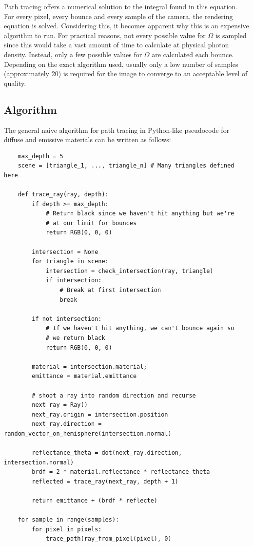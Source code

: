 \documentclass[
  twoside,
  11pt, a4paper,
  footinclude=true,
  headinclude=true,
  cleardoublepage=empty
]{scrreprt}
\begin{document}
Path tracing offers a numerical solution to the integral found in this equation. For every pixel,
every bounce and every sample of the camera, the rendering equation is solved. Considering this, it becomes apparent
why this is an expensive algorithm to run. For practical reasons, not every possible value for
\(\Omega\) is sampled since this would take a vast amount of time to calculate at physical photon
density. Instead, only a few possible values for \(\Omega\) are calculated each bounce. Depending
on the exact algorithm used, usually only a low number of samples (approximately 20) is required for the
image to converge to an acceptable level of quality.

\subsection{Algorithm}
\label{algorithm}
The general naive algorithm for path tracing in Python-like pseudocode for diffuse and
emissive materials can be written as follows:

\begin{verbatim}
    max_depth = 5
    scene = [triangle_1, ..., triangle_n] # Many triangles defined here

    def trace_ray(ray, depth):
        if depth >= max_depth:
            # Return black since we haven't hit anything but we're
            # at our limit for bounces
            return RGB(0, 0, 0) 

        intersection = None
        for triangle in scene:
            intersection = check_intersection(ray, triangle)
            if intersection:
                # Break at first intersection
                break

        if not intersection:
            # If we haven't hit anything, we can't bounce again so
            # we return black
            return RGB(0, 0, 0)

        material = intersection.material;
        emittance = material.emittance

        # shoot a ray into random direction and recurse
        next_ray = Ray()
        next_ray.origin = intersection.position
        next_ray.direction = random_vector_on_hemisphere(intersection.normal)

        reflectance_theta = dot(next_ray.direction, intersection.normal)
        brdf = 2 * material.reflectance * reflectance_theta
        reflected = trace_ray(next_ray, depth + 1)

        return emittance + (brdf * reflecte)

    for sample in range(samples):
        for pixel in pixels:
            trace_path(ray_from_pixel(pixel), 0)
\end{verbatim}
\end{document}
